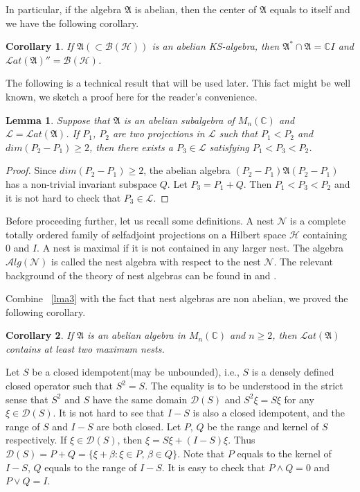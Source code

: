 \documentclass[a4paper,10pt]{amsart}
\newtheorem{corollary}{Corollary}[section]
\newtheorem{lemma}{Lemma}[section]
\theoremstyle{refs}
\newcommand{\AAA}{\mathfrak A}
\newcommand{\BBB}{\mathcal B}
\newcommand{\HHH}{\mathcal H} %
\newcommand{\LLL}{\mathcal L} %
\newcommand{\PPP}[1]{ P_{#1}} %
\newcommand{\Lat}{\mathcal Lat}
\newcommand{\Alg}{\mathcal Alg}
\newcommand{\C}{\mathbb C} %
\begin{document}
In particular, if the algebra $\AAA$ is abelian, then the center of
$\AAA$ equals
to itself and we have the following corollary.

\begin{corollary} \label{cor1}
If $\AAA (\subset \BBB(\HHH))$ is an abelian KS-algebra, then
$\AAA^{*} \cap \AAA = \C I$ and $\Lat(\AAA)'' = \BBB(\HHH)$.
\end{corollary}

The following is a technical result that will be used later.
This fact might be well known, we sketch a proof here for the reader's
convenience.

\begin{lemma}\label{lma2}
Suppose that $\AAA$ is an abelian
subalgebra of $M_n(\C)$ and $\LLL = \Lat(\AAA)$.
If $\PPP{1}$, $\PPP{2}$ are two projections
in $\LLL$ such that $\PPP{1} < \PPP{2}$ and $dim(\PPP{2}-\PPP{1}) \geq 2$, then
there exists a $\PPP{3} \in \LLL$ satisfying $\PPP{1} < \PPP{3} < \PPP{2}$.
\end{lemma}

\begin{proof}
Since $dim(\PPP{2}-\PPP{1}) \geq 2$, the abelian algebra $(P_2 - P_1)\AAA(P_2 -
P_1)$ has a non-trivial invariant subspace $Q$. Let $P_{3} = P_{1} + Q$. Then
$\PPP{1} < \PPP{3} < \PPP{2}$ and it is not hard to check that $P_{3} \in
\LLL$.
\end{proof}

Before proceeding further, let us recall some definitions.
A nest $\mathcal{N}$ is a complete totally ordered family of
selfadjoint projections on a Hilbert space $\HHH$ containing $0$ and $I$.
A nest is maximal if it is not contained in any larger nest. The algebra
$\Alg(\mathcal{N})$ is called the nest algebra with respect to the nest
$\mathcal{N}$. The relevant background of the theory of nest algebras
can be found in \cite{Dv} and \cite{RR}.

Combine ~\cref{lma3} with the fact that nest algebras are non abelian,
we proved the following corollary.

\begin{corollary} \label{cor2}
If $\AAA$ is an abelian algebra in $M_n(\C)$ and $n \geq 2$, then $\Lat(\AAA)$ contains at
least two maximum nests.
\end{corollary}

Let $S$ be a closed idempotent(may be unbounded), i.e., $S$ is a densely defined
closed operator such that $S^2 = S$. The equality is to be understood in the
strict
sense that $S^2$ and $S$ have the same domain $\mathcal{D}(S)$ and $S^{2}\xi =
S\xi$ for
any $\xi \in \mathcal{D}(S)$. It is not hard to see that $I-S$ is also a closed
idempotent, and the range of $S$ and $I-S$ are both closed.
Let $P$, $Q$ be the range and kernel of $S$ respectively.
If $\xi \in \mathcal{D}(S)$, then $\xi = S\xi + (I-S)\xi$. Thus $\mathcal{D}(S)
= P
+ Q = \{\xi + \beta : \xi \in P \mbox{, } \beta \in Q \}$. Note that
$P$ equals to the kernel of $I-S$, $Q$ equals to the range of $I-S$.
It is easy to check that $P \wedge Q = 0$ and $P \vee Q = I$.
\end{document}
